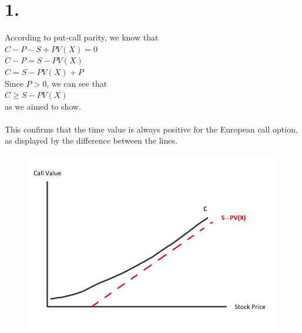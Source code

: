 \documentclass{article}
\begin{document}
\thispagestyle{firstpageheader}

\section*{1.}

{\Large 

According to put-call parity, we know that \\
$C - P - S + PV(X) = 0$ \\
$C - P = S - PV(X)$ \\
$C = S - PV(X) + P$ \\
Since $P > 0$, we can see that \\
$C \geq S - PV(X)$ \\
as we aimed to show. \\ \\
This confirms that the time value is always positive for the European call option, as displayed by the difference between the lines.

\begin{figure}[h]
  \centering
  \includegraphics[width=120mm]{./1.png}
\end{figure}

\newpage

}
\end{document}
